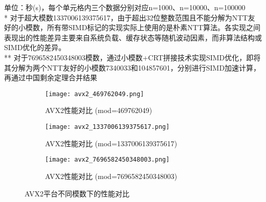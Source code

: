 \documentclass[a4paper,colorlinks=true,linkcolor=blue,urlcolor=blue,citecolor=green,bookmarks=true]{article}
\begin{document}
\begin{table}[H]
\centering
\caption{AVX2平台不同实现性能对比}
\vspace{0.3em}
\begin{flushleft}
\normalsize{单位：秒(s)，每个单元格内三个数据分别对应n=1000、n=10000、n=100000}\\
\normalsize{* 对于超大模数1337006139375617，由于超出32位整数范围且不能分解为NTT友好的小模数，所有带SIMD标记的实现实际上使用的是朴素NTT算法。各实现之间表现出的性能差异主要来自系统负载、缓存状态等随机波动因素，而非算法结构或SIMD优化的差异。}\\
\normalsize{** 对于7696582450348003模数，通过小模数+CRT拼接技术实现SIMD优化，即将其分解为两个NTT友好的小模数7340033和104857601，分别进行SIMD加速计算，再通过中国剩余定理合并结果}
\end{flushleft}
\end{table}


\begin{figure}[H]
  \centering
  \begin{subfigure}[b]{0.32\textwidth}
    \centering
    \texttt{[image: avx2\_469762049.png]}
    \caption{AVX2性能对比 (mod=469762049)}
    \label{fig:avx2_469762049}
  \end{subfigure}
  \hfill
  \begin{subfigure}[b]{0.32\textwidth}
    \centering
    \texttt{[image: avx2\_1337006139375617.png]}
    \caption{AVX2性能对比 (mod=1337006139375617)}
    \label{fig:avx2_1337006139375617}
  \end{subfigure}
  \hfill
  \begin{subfigure}[b]{0.32\textwidth}
    \centering
    \texttt{[image: avx2\_7696582450348003.png]}
    \caption{AVX2性能对比 (mod=7696582450348003)}
    \label{fig:avx2_7696582450348003}
  \end{subfigure}
  \caption{AVX2平台不同模数下的性能对比}
  \label{fig:avx2_performance}
\end{figure}
\end{document}
